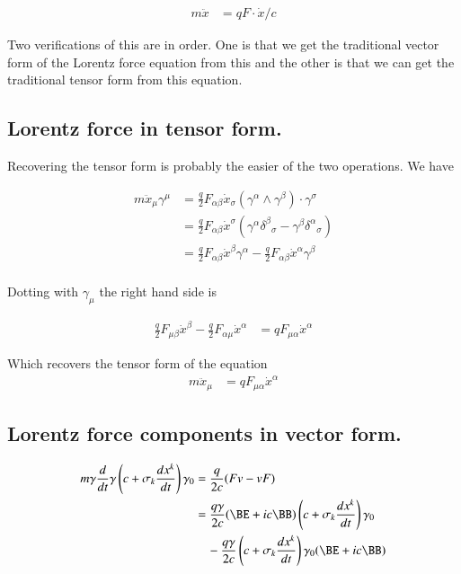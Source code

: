 \documentclass{article}
\begin{document}
\begin{align}
m \ddot{x} &= q F \cdot \dot{x}/c
\end{align}

Two verifications of this are in order.  One is that we get the traditional vector form of the Lorentz force equation from
this and the other is that we can get the traditional tensor form from this equation.

\subsection{ Lorentz force in tensor form. }

Recovering the tensor form is probably the easier of the two operations.  We have

\begin{align*}
m \ddot{x}_\mu \gamma^\mu
&= \frac{q}{2} F_{\alpha\beta} \dot{x}_\sigma (\gamma^{\alpha} \wedge \gamma^\beta) \cdot \gamma^\sigma \\
&= \frac{q}{2} F_{\alpha\beta} \dot{x}^\sigma (\gamma^{\alpha} {\delta^\beta}_\sigma -\gamma^{\beta} {\delta^\alpha}_\sigma ) \\
&= \frac{q}{2} F_{\alpha\beta} \dot{x}^\beta \gamma^{\alpha} - \frac{q}{2} F_{\alpha\beta} \dot{x}^\alpha \gamma^{\beta} \\
\end{align*}

Dotting with $\gamma_\mu$ the right hand side is

\begin{align*}
\frac{q}{2} F_{\mu\beta} \dot{x}^\beta - \frac{q}{2} F_{\alpha\mu} \dot{x}^\alpha 
&= {q} F_{\mu\alpha} \dot{x}^\alpha 
\end{align*}

Which recovers the tensor form of the equation
\begin{align}
m \ddot{x}_\mu &= {q} F_{\mu\alpha} \dot{x}^\alpha 
\end{align}

\subsection{ Lorentz force components in vector form. }

\begin{align*}
m \gamma \frac{d}{dt} \gamma \left(c + \sigma_k \frac{dx^k}{dt}\right) \gamma_0
&= \frac{q}{2c}(F v - v F) \\
&=
\frac{q \gamma}{2c} 
(\BE + i c\BB) 
\left(c + \sigma_k \frac{dx^k}{dt}\right) \gamma_0
\\
&\quad -
\frac{q \gamma}{2c} 
\left(c + \sigma_k \frac{dx^k}{dt}\right) \gamma_0
(\BE + i c\BB) \\
\end{align*}
\end{document}
